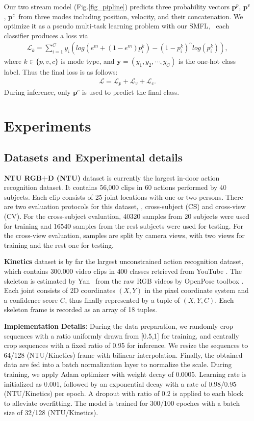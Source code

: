 \documentclass{article}
\begin{document}
Our two stream model (Fig.\ref{fig_pipline}) predicts three probability vectors $ \bm{p}^p $, $ \bm{p}^v $, $ \bm{p}^c $\ from three modes including position, velocity, and their concatenation. We optimize it as a pseudo multi-task learning problem with our SMFL, \ie~each classifier produces a loss via
{\myfont
	\begin{align}
	\mathcal{L}_k = \sum_{i=1}^{C}y_i\left(log( e^m+(1-e^m)p_i^k)-(1-p_i^k)^{\gamma}log(p_i^k) \right),
	\end{align}
}where $ k\in \{p,v,c\}  $ is mode type, and {\myfont$ \bm{y}=(y_1,y_2,\cdots,y_C) $} is the one-hot class label. Thus the final loss is as follows:
{\myfont
	\begin{align}
	\mathcal{L} = \mathcal{L}_p + \mathcal{L}_v + \mathcal{L}_c.
	\end{align}
}During inference, only $ \bm{p}^c $ is used to predict the final class.

\section{Experiments}
\subsection{Datasets and Experimental details}
\textbf{NTU RGB+D (NTU)} dataset  \cite{DBLP:conf/cvpr/ShahroudyLNW16} is currently the largest in-door action recognition dataset. It contains 56,000 clips in 60 actions performed by 40 subjects. Each clip consists of 25 joint locations with one or two persons. There are two evaluation protocols for this dataset, \ie, cross-subject (CS) and cross-view (CV). For the cross-subject evaluation, 40320 samples from 20 subjects were used for training and 16540 samples from the rest subjects were used for testing. For the cross-view evaluation, samples are split by camera views, with two views for training and the rest one for testing.

\textbf{Kinetics} dataset is by far the largest unconstrained action recognition dataset, which contains 300,000 video clips
in 400 classes retrieved from YouTube \cite{DBLP:conf/aaai/YanXL18}. The skeleton is estimated by Yan \etal~from the raw RGB videos by OpenPose toolbox \cite{DBLP:conf/aaai/YanXL18}. Each joint consists of 2D coordinates $ (X,Y) $ in the pixel coordinate system and a confidence score $ C $, thus finally represented by a tuple of $(X,Y,C)$. Each skeleton frame is recorded as an array of 18 tuples. 

\textbf{Implementation Details:} During the data preparation,
we randomly crop sequences with a ratio uniformly drawn from [0.5,1] for training, and centrally crop sequences with a fixed ratio of 0.95 for inference. We resize the sequences to 64/128 (NTU/Kinetics) frame with bilinear interpolation. Finally, the obtained data are fed into a batch normalization layer to normalize the scale. During training, we apply Adam optimizer with  weight decay of 0.0005. Learning rate is initialized as 0.001, followed by an exponential decay with a rate of 0.98/0.95 (NTU/Kinetics) per epoch. A dropout with ratio of 0.2 is applied to each block to alleviate overfitting. The model is trained for 300/100 epoches with a batch size of 32/128 (NTU/Kinetics).
\end{document}
